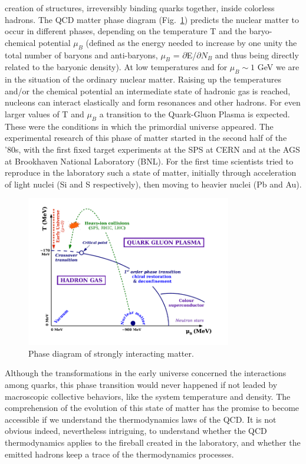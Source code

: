 creation of structures, irreversibly binding quarks together, inside colorless
hadrons. The QCD matter phase diagram (Fig.~\ref{fig:QCDphase}) predicts the nuclear matter to occur in different phases, depending on the temperature T and the baryo-chemical potential $\mu_{B}$ (defined as the energy needed to increase by one unity the total number of baryons and anti-baryons, $\mu_{B}$ = $\partial$E/$\partial N_B$ and thus being directly related to the baryonic density). 
At low temperatures and for $\mu_{B} \sim 1$ GeV we are in the situation of the ordinary nuclear matter. Raising up the temperatures and/or the chemical potential an intermediate state of hadronic gas is reached, nucleons can interact elastically and form resonances and other hadrons. For even larger values of T and $\mu_{B}$ a transition to the Quark-Gluon Plasma is expected. These were the conditions in which the primordial universe appeared.
The experimental research of this phase of matter started in the second half of the ’80s, with the first fixed target experiments at the SPS at CERN and at the AGS at Brookhaven National Laboratory (BNL). For the first time scientists tried to reproduce in the laboratory such a state of matter, initially through acceleration of light nuclei (Si and S respectively), then moving to heavier nuclei (Pb and Au).\\


\begin{figure}[h!]
\centering
 \includegraphics[width=0.8\textwidth] {FigCap1/QCDphase.jpeg}
\caption{Phase diagram of strongly interacting matter.}
\label{fig:QCDphase}
\end{figure}

Although the transformations in the early universe concerned the interactions among quarks,
this phase transition would never happened if not leaded by macroscopic
collective behaviors, like the system temperature and density. The comprehension of the evolution of this state of matter 
has the promise to become accessible if we understand the thermodynamics laws of the QCD. It is not obvious indeed, nevertheless intriguing,  to understand whether the QCD thermodynamics applies to the fireball created in the laboratory, and whether the emitted hadrons keep a trace of the thermodynamics processes. \\

